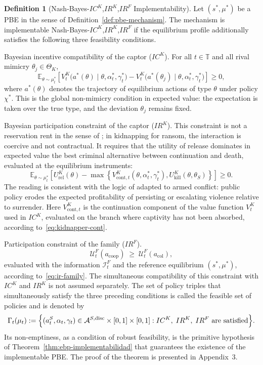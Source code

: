 \documentclass[ecta,nameyear,draft]{econsocart}
\providecommand{\textcite}{\citet}
\theoremstyle{plain}
\theoremstyle{definition}
\newtheorem{definition}[theorem]{Definition}
\newcommand{\ThetaK}{\Theta_K}
\newcommand{\1}{\mathbf{1}}
\begin{document}
\begin{definition}[Nash-Bayes-$IC^K$,$IR^K$,$IR^F$ Implementability]
\label{def:implementable-mechanism}
Let $(s^\ast,\mu^\ast)$ be a PBE in the sense of Definition~\ref{def:pbe-mechanism}. The mechanism is implementable Nash-Bayes-$IC^K$,$IR^K$,$IR^F$ if the equilibrium profile additionally satisfies the following three feasibility conditions.

\smallskip
\noindent Bayesian incentive compatibility of the captor \textup{(}$IC^K$\textup{)}. For all $t\in\mathbb{T}$ and all rival mimicry $\theta_j\in\ThetaK$,
\[
\mathbb{E}_{\theta\sim\mu_t^\ast}
\left[
V^K_t\!\bigl(a^\ast(\theta)\mid \theta,\alpha_t^\ast,\gamma_t^\ast\bigr)
-
V^K_t\!\bigl(a^\ast(\theta_j)\mid \theta,\alpha_t^\ast,\gamma_t^\ast\bigr)
\right]
\ge 0,
\]
where $a^\ast(\theta)$ denotes the trajectory of equilibrium actions of type $\theta$ under policy $\chi^\ast$. This is the global non-mimicry condition in expected value: the expectation is taken over the true type, and the deviation $\theta_j$ remains fixed.

\smallskip
\noindent Bayesian participation constraint of the captor \textup{(}$IR^K$\textup{)}. This constraint is not a reservation rent in the sense of \textcite{Myerson1979IC}; in kidnapping for ransom, the interaction is coercive and not contractual. It requires that the utility of release dominates in expected value the best criminal alternative between continuation and death, evaluated at the equilibrium instruments:
\[
\mathbb{E}_{\theta\sim\mu_t^\ast}
\left[
U^K_{\mathrm{rel}}(\theta)
-
\max\left\{
V^K_{\mathrm{cont},t}(\theta,\alpha_t^\ast,\gamma_t^\ast),
U^K_{\mathrm{kill}}(\theta,\theta_S)
\right\}
\right]
\ge0.
\]
The reading is consistent with the logic of \textcite{Becker1968} adapted to armed conflict: public policy erodes the expected profitability of persisting or escalating violence relative to surrender. Here $V^K_{\mathrm{cont},t}$ is the continuation component of the value function $V^K_t$ used in $IC^K$, evaluated on the branch where captivity has not been absorbed, according to~\eqref{eq:kidnapper-cont}.

\smallskip
\noindent Participation constraint of the family \textup{(}$IR^F$\textup{)}.
\[
\mathcal{U}^F_t(a_{\mathrm{coop}})\;\ge\;\mathcal{U}^F_t(a_{\mathrm{col}}),
\]
evaluated with the information $\mathcal{I}_t^F$ and the reference equilibrium $(s^\ast,\mu^\ast)$, according to~\eqref{eq:ir-family}.
The simultaneous compatibility of this constraint with $IC^K$ and $IR^K$ is not assumed separately. The set of policy triples that simultaneously satisfy the three preceding conditions is called the feasible set of policies and is denoted by
\begin{equation}
\label{eq:gamma-factible}
\Gamma_t(\mu_t)
:=\Bigl\{(a_t^S,\alpha_t,\gamma_t)\in
\mathcal{A}^{S,\mathrm{disc}}\times[0,1]\times[0,1] :
IC^K,\;IR^K,\;IR^F
\text{ are satisfied}\Bigr\}.
\end{equation}
Its non-emptiness, as a condition of robust feasibility, is the primitive hypothesis of Theorem~\ref{thm:ebp-implementabilidad} that guarantees the existence of the implementable PBE. The proof of the theorem is presented in Appendix~3.
\end{definition}
\end{document}

